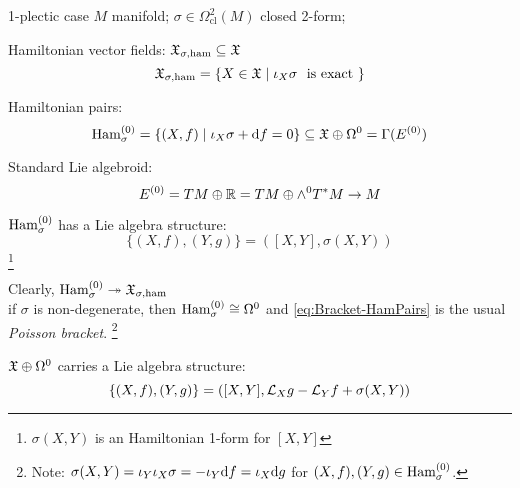 \documentclass[beamer,10pt]{standalone}
\begin{document}


\begin{frame}{1-plectic case}
	$M$ manifold; $\sigma \in \Omega^2_{\mathrm{cl}}(M)$ closed 2-form;
	\vfill

	Hamiltonian vector fields:
	$\mathfrak{X}_{\sigma,\text{ham}} \subseteq \mathfrak{X}$
	$$ \mathfrak{X}_{\sigma,\text{ham}} = \{ X \in \mathfrak{X} \mid \iota_X \sigma ~~\textrm{is exact }\}$$
	\vfill

	Hamiltonian pairs:
	$$\text{Ham}^{(0)}_\sigma = \{(X,f) \mid \iota_X \sigma + \mathrm{d} f = 0 \}
	\subseteq \mathfrak{X}\oplus \Omega^0 = \Gamma(E^{(0)})$$
	\vfill

	Standard Lie algebroid:
	$$ E^{(0)} = TM \oplus \mathbb{R} = TM \oplus \wedge^0 T^* M \to M$$

\end{frame}

\begin{frame}
	$\text{Ham}^{(0)}_\sigma$ has a Lie algebra structure:
	\begin{equation}\label{eq:Bracket-HamPairs}
		\{ (X,f), (Y,g)\} = ( [X,Y], \sigma(X,Y))
	\end{equation}
	\footnote{$\sigma(X,Y)$ is an Hamiltonian 1-form for $[X,Y]$}
	\vfill

	Clearly, $\text{Ham}^{(0)}_\sigma \twoheadrightarrow \mathfrak{X}_{\sigma,\text{ham}}$
	\\
	if $\sigma$ is non-degenerate, then $\text{Ham}^{(0)}_\sigma \cong \Omega^0$ and \eqref{eq:Bracket-HamPairs} is the usual \emph{Poisson bracket}.
	\footnote{Note: $\sigma(X,Y) = \iota_Y \iota_X \sigma = -\iota_Y \mathrm{d} f = \iota_X \mathrm{d} g$ for $(X,f), (Y,g) \in \text{Ham}^{(0)}_\sigma$.}
	\vfill

	\seprule
	$\mathfrak{X}\oplus \Omega^0$ carries a Lie algebra structure:
	\begin{equation}\label{eq:Bracket-LieAlgoid}
		\{ (X,f), (Y,g)\} = ( [X,Y], \mathcal{L}_X g - \mathcal{L}_Y f + \sigma(X,Y) )
	\end{equation}

\end{frame}
\end{document}
